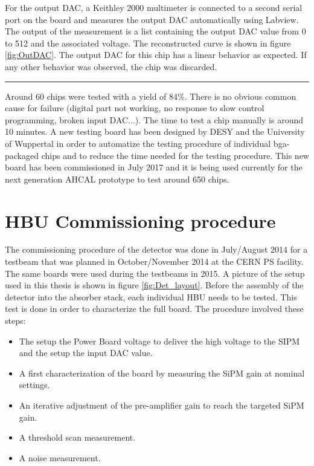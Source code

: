For the output DAC, a Keithley 2000 multimeter is connected to a second serial port on the board and measures the output DAC automatically using Labview. The output of the measurement is a list containing the output DAC value from 0 to 512 and the associated voltage. The reconstructed curve is shown in figure \ref{fig:OutDAC}. The output DAC for this chip has a linear behavior as expected. If any other behavior was observed, the chip was discarded.

\begin{center}
  \rule{0.5\textwidth}{.4pt}
\end{center}

Around 60 chips were tested with a yield of 84\%. There is no obvious common cause for failure (digital part not working, no response to slow control programming, broken input DAC...). The time to test a chip manually is around 10 minutes. A new testing board has been designed by DESY and the University of Wuppertal in order to automatize the testing procedure of individual \acrshort{bga}-packaged chips \cite{AHCALMain2016_Amine} and to reduce the time needed for the testing procedure. This new board has been commissioned in July 2017 and it is being used currently for the next generation AHCAL prototype to test around 650 chips.

\section{HBU Commissioning procedure}

The commissioning procedure of the detector was done in July/August 2014 for a testbeam that was planned in October/November 2014 at the CERN PS facility. The same boards were used during the testbeams in 2015. A picture of the setup used in this thesis is shown in figure \ref{fig:Det_layout}. Before the assembly of the detector into the absorber stack, each individual HBU needs to be tested. This test is done in order to characterize the full board. The procedure involved these steps:

\begin{itemize}
  \item The setup the Power Board voltage to deliver the high voltage to the SIPM and the setup the input DAC value.
  \item A first characterization of the board by measuring the SiPM gain at nominal settings.
  \item An iterative adjustment of the pre-amplifier gain to reach the targeted SiPM gain.
  \item A threshold scan measurement.
  \item A noise measurement.
\end{itemize}

